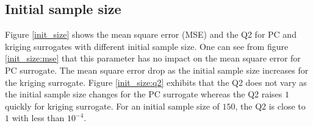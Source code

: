 \documentclass[hidelinks,12pt]{article}
\begin{document}
\subsection{Initial sample size}

Figure \ref{init_size} shows the mean square error (MSE) and the Q2 for PC and kriging surrogates with different initial sample size. One can see from figure \ref{init_size:mse} that this parameter has no impact on the mean square error for PC surrogate. The mean square error drop as the initial sample size increases for the kriging surrogate. Figure \ref{init_size:q2} exhibits that the Q2 does not vary as the initial sample size changes for the PC surrogate whereas the Q2 raises $1$ quickly for kriging surrogate. For an initial sample size of $150$, the Q2 is close to $1$ with less than $10^{-4}$.
\end{document}
